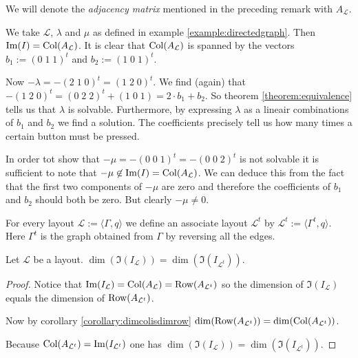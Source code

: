 \begin{definition}
	We will denote the \emph{adjacency matrix} mentioned in the preceding
	remark with $A_{\mathcal{L}}$. 
\end{definition}

\begin{example}
	We take $\mathcal{L}$, $\lambda$ and $\mu$ as defined in example
	\ref{example:directedgraph}. Then $\operatorname{Im}(I) = \operatorname{Col}(A_{\mathcal{L}})$. It
	is clear that $\operatorname{Col}(A_{\mathcal{L}})$ is spanned by the vectors $b_{1}
	:= (0\;1\;1)^{t}$ and $b_{2} := (1\;0\;1)^{t}$.
	
	Now $-\lambda = -(2\;1\;0)^{t} = (1\;2\;0)^{t}$. We find (again) that
	$-(1\;2\;0)^{t} = (0\;2\;2)^{t} + (1\;0\;1) = 2\cdot b_{1} + b_{2}$. So
	theorem \ref{theorem:equivalence} tells us that $\lambda$ is solvable.
	Furthermore, by expressing $\lambda$ as a lineair combinations of
	$b_{1}$ and $b_{2}$ we find a solution. The coefficients precisely tell
	us how many times a certain button must be pressed.
	
	In order tot show that $-\mu = -(0\;0\;1)^{t} = -(0\;0\;2)^{t}$ is not
	solvable it is sufficient to note that
	$-\mu\not\in\operatorname{Im}(I)=\operatorname{Col}(A_{\mathcal{L}})$. We can deduce this from the
	fact that the first two components of $-\mu$ are zero and therefore the
	coefficients of $b_{1}$ and $b_{2}$ should both be zero. But clearly
	$-\mu \not= 0$. 
\end{example}

\begin{definition}
	For every layout $\mathcal{L}:=\langle\Gamma,q\rangle$ we define an
	associate layout $\mathcal{L}^{t}$ by $\mathcal{L}^{t} :=
	\langle\Gamma^{t},q\rangle$. Here $\Gamma^{t}$ is the graph obtained
	from $\Gamma$ by reversing all the edges.
\end{definition}

\begin{theorem}\label{theorem:transpose}
	Let $\mathcal{L}$ be a layout. $\dim(\Im(I_{\mathcal{L}})) =
	\dim(\Im(I_{\mathcal{L}^{t}}))$.
\end{theorem}

\begin{proof}
	Notice that $\operatorname{Im}( I_{\mathcal{L}} ) = \operatorname{Col}( A_{\mathcal{L}} ) = \operatorname{Row}(
	A_{\mathcal{L}^{t}} )$ so the dimension of $\Im( I_{\mathcal{L}} )$
	equals the dimension of $\operatorname{Row}( A_{\mathcal{L}^{t}} )$. 
	
	Now by corollary \ref{corollary:dimcolisdimrow} $\dim( \operatorname{Row}(
	A_{\mathcal{L}^{t}} ) ) = \dim( \operatorname{Col}( A_{\mathcal{L}^{t}} ) )$. 
	
	Because $\operatorname{Col}( A_{\mathcal{L}^{t}} ) = \operatorname{Im}( I_{\mathcal{L}^{t}} )$ one
	has $\dim( \Im( I_{\mathcal{L}} ) ) = \dim( \Im( I_{\mathcal{L}^{t}} )
	)$.
\end{proof}

